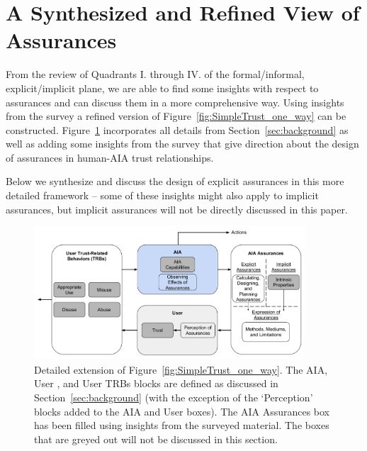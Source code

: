 \section{A Synthesized and Refined View of Assurances} \label{sec:synthesis}
    From the review of Quadrants I. through IV. of the formal/informal, explicit/implicit plane, we are able to find some insights with respect to assurances and can discuss them in a more comprehensive way. Using insights from the survey a refined version of Figure~\ref{fig:SimpleTrust_one_way} can be constructed. Figure~\ref{fig:refined_assurances} incorporates all details from Section~\ref{sec:background} as well as adding some insights from the survey that give direction about the design of assurances in human-AIA trust relationships. 
   
   Below we synthesize and discuss the design of explicit assurances in this more detailed framework -- some of these insights might also apply to implicit assurances, but implicit assurances will not be directly discussed in this paper.

    \begin{figure}[htbp]
        \centering
        \includegraphics[width=0.9\textwidth]{Figures/RefinedTrust_one_way}
        \caption{Detailed extension of Figure~\ref{fig:SimpleTrust_one_way}. The AIA, User , and User TRBs blocks are defined as discussed in Section~\ref{sec:background} (with the exception of the `Perception' blocks added to the AIA and User boxes). The AIA Assurances box has been filled using insights from the surveyed material. The boxes that are greyed out will not be discussed in this section.}
        \label{fig:refined_assurances}
    \end{figure}

